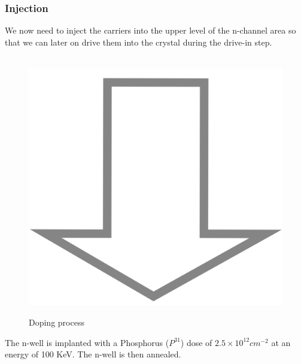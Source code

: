 \subsubsection{Injection}
We now need to inject the carriers into the upper level of the n-channel area so that we can later on drive them into the crystal during the drive-in step.
\begin{figure}[H]
	\centering
	\begin{tikzpicture}[node distance = 3cm, auto, thick,scale=\CrossSectionOnly, every node/.style={transform shape}]
		
	\end{tikzpicture} \\
	\includegraphics[scale=0.01]{down_arrow.png} \\
	\begin{tikzpicture}[node distance = 3cm, auto, thick,scale=\CrossSectionOnly, every node/.style={transform shape}]
		
	\end{tikzpicture}
	\caption{Doping process}
\end{figure}
The n-well is implanted with a Phosphorus ($P^{31}$) dose of $2.5\times10^{12}cm^{-2}$ at an energy of 100 KeV.
The n-well is then annealed.

